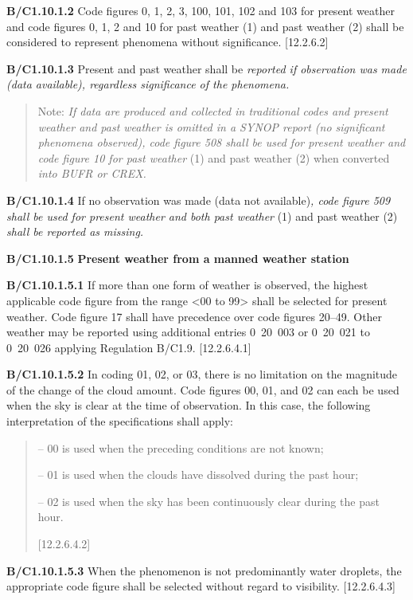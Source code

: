 \textbf{B/C1.10.1.2} Code figures 0, 1, 2, 3, 100, 101, 102 and 103 for present weather and code figures 0, 1, 2 and 10 for past weather (1) and past weather (2) shall be considered to represent phenomena without significance. {[}12.2.6.2{]}

\textbf{B/C1.10.1.3} Present and past weather shall be \emph{reported if observation was made (data available), regardless significance of the phenomena.}

\begin{quote}
Note: \emph{If data are produced and collected in traditional codes and present weather and past weather is omitted in a SYNOP report (no significant phenomena observed), code figure 508 shall be used for present weather and code figure 10 for past weather} (1) and past weather (2) when converted \emph{into BUFR or CREX.}
\end{quote}

\textbf{B/C1.10.1.4} If no observation was made (data not available)\emph{, code figure 509 shall be used for present weather and both past weather} (1) and past weather (2) \emph{shall be reported as missing.}

\textbf{B/C1.10.1.5} \textbf{Present weather from a manned weather station}

\textbf{B/C1.10.1.5.1} If more than one form of weather is observed, the highest applicable code figure from the range \textless00 to 99\textgreater{} shall be selected for present weather. Code figure 17 shall have precedence over code figures 20--49. Other weather may be reported using additional entries 0~20~003 or 0~20~021 to 0~20~026 applying Regulation B/C1.9. {[}12.2.6.4.1{]}

\textbf{B/C1.10.1.5.2} In coding 01, 02, or 03, there is no limitation on the magnitude of the change of the cloud amount. Code figures 00, 01, and 02 can each be used when the sky is clear at the time of observation. In this case, the following interpretation of the specifications shall apply:

\begin{quote}
-- 00 is used when the preceding conditions are not known;

-- 01 is used when the clouds have dissolved during the past hour;

-- 02 is used when the sky has been continuously clear during the past hour.

{[}12.2.6.4.2{]}
\end{quote}

\textbf{B/C1.10.1.5.3} When the phenomenon is not predominantly water droplets, the appropriate code figure shall be selected without regard to visibility. {[}12.2.6.4.3{]}

